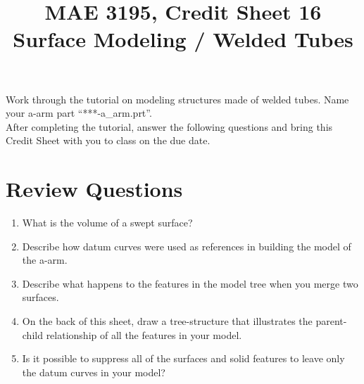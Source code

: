 \documentclass[12pt]{article}
\title{MAE 3195, Credit Sheet 16\\ Surface Modeling / Welded Tubes}
\date{}
\begin{document}
\maketitle

Work through the tutorial on modeling structures made of welded tubes. Name your a-arm part ``***-a\_arm.prt''.\\

After completing the tutorial, answer the following questions and bring this Credit Sheet with you to class on the due date.

\pagebreak
\section*{Review Questions}
\begin{enumerate}
	\item What is the volume of a swept surface?
	\vspace{1.25in}
	\item Describe how datum curves were used as references in building the model of the a-arm.
	\vspace{1.25in}
	\item Describe what happens to the features in the model tree when you merge two surfaces.
	\vspace{1.25in}
	\item On the back of this sheet, draw a tree-structure that illustrates the parent-child relationship of all the features in your model.
	\vspace{.25in}
	\item Is it possible to suppress all of the surfaces and solid features to leave only the datum curves in your model?
\end{enumerate}
\end{document}
